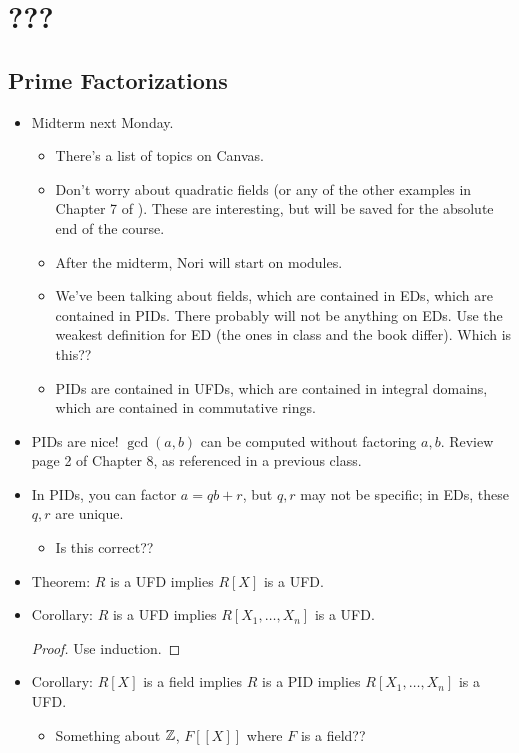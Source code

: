 \documentclass[../notes.tex]{subfiles}
\begin{document}
\chapter{???}
\section{Prime Factorizations}
\begin{itemize}
    \item {}Midterm next Monday.
    \begin{itemize}
        \item There's a list of topics on Canvas.
        \item Don't worry about quadratic fields (or any of the other examples in Chapter 7 of \textcite{bib:DummitFoote}). These are interesting, but will be saved for the absolute end of the course.
        \item After the midterm, Nori will start on modules.
        \item We've been talking about fields, which are contained in EDs, which are contained in PIDs. There probably will not be anything on EDs. Use the weakest definition for ED (the ones in class and the book differ). Which is this??
        \item PIDs are contained in UFDs, which are contained in integral domains, which are contained in commutative rings.
    \end{itemize}
    \item PIDs are nice! $\gcd(a,b)$ can be computed without factoring $a,b$. Review page 2 of Chapter 8, as referenced in a previous class.
    \item In PIDs, you can factor $a=qb+r$, but $q,r$ may not be specific; in EDs, these $q,r$ are unique.
    \begin{itemize}
        \item Is this correct??
    \end{itemize}
    \item Theorem: $R$ is a UFD implies $R[X]$ is a UFD.
    \item Corollary: $R$ is a UFD implies $R[X_1,\dots,X_n]$ is a UFD.
    \begin{proof}
        Use induction.
    \end{proof}
    \item Corollary: $R[X]$ is a field implies $R$ is a PID implies $R[X_1,\dots,X_n]$ is a UFD.
    \begin{itemize}
        \item Something about $\mathbb{Z}$, $F[[X]]$ where $F$ is a field??

\end{itemize}
\end{itemize}
\end{document}
